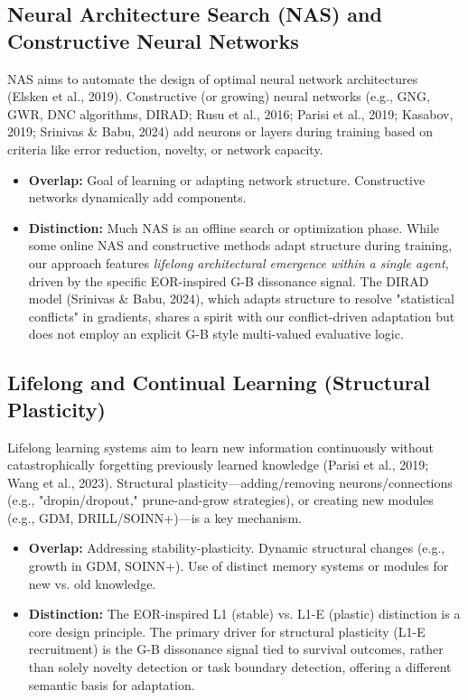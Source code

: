 \documentclass{article}
\begin{document}
\subsection{Neural Architecture Search (NAS) and Constructive Neural Networks}
NAS aims to automate the design of optimal neural network architectures (Elsken et al., 2019). Constructive (or growing) neural networks (e.g., GNG, GWR, DNC algorithms, DIRAD; Rusu et al., 2016; Parisi et al., 2019; Kasabov, 2019; Srinivas \& Babu, 2024) add neurons or layers during training based on criteria like error reduction, novelty, or network capacity.
\begin{itemize}
    \item \textbf{Overlap:} Goal of learning or adapting network structure. Constructive networks dynamically add components.
    \item \textbf{Distinction:} Much NAS is an offline search or optimization phase. While some online NAS and constructive methods adapt structure during training, our approach features \textit{lifelong architectural emergence within a single agent}, driven by the specific EOR-inspired G-B dissonance signal. The DIRAD model (Srinivas \& Babu, 2024), which adapts structure to resolve "statistical conflicts" in gradients, shares a spirit with our conflict-driven adaptation but does not employ an explicit G-B style multi-valued evaluative logic.
\end{itemize}

\subsection{Lifelong and Continual Learning (Structural Plasticity)}
Lifelong learning systems aim to learn new information continuously without catastrophically forgetting previously learned knowledge (Parisi et al., 2019; Wang et al., 2023). Structural plasticity—adding/removing neurons/connections (e.g., "dropin/dropout," prune-and-grow strategies), or creating new modules (e.g., GDM, DRILL/SOINN+)—is a key mechanism.
\begin{itemize}
    \item \textbf{Overlap:} Addressing stability-plasticity. Dynamic structural changes (e.g., growth in GDM, SOINN+). Use of distinct memory systems or modules for new vs. old knowledge.
    \item \textbf{Distinction:} The EOR-inspired L1 (stable) vs. L1-E (plastic) distinction is a core design principle. The primary driver for structural plasticity (L1-E recruitment) is the G-B dissonance signal tied to survival outcomes, rather than solely novelty detection or task boundary detection, offering a different semantic basis for adaptation.
\end{itemize}
\end{document}
